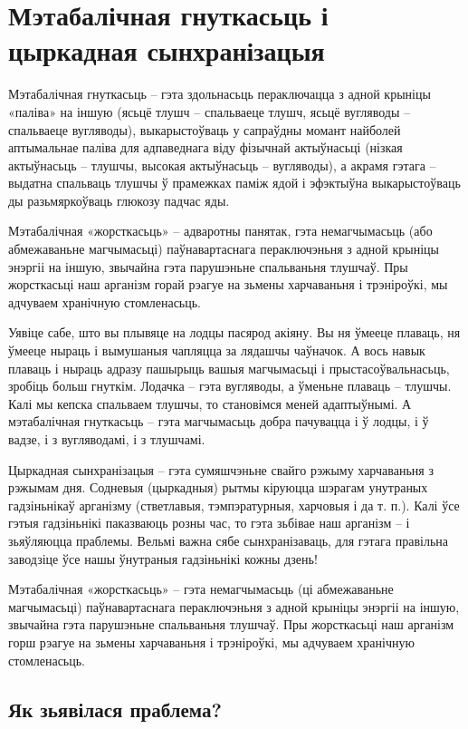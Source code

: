 \chapter{Мэтабалічная гнуткасьць і цыркадная сынхранізацыя}

Мэтабалічная гнуткасьць – гэта здольнасьць пераключацца з адной крыніцы «паліва» на іншую (ясьцё тлушч – спальваеце тлушч, ясьцё вугляводы – спальваеце вугляводы), выкарыстоўваць у сапраўдны момант найболей аптымальнае паліва для адпаведнага віду фізычнай актыўнасьці (нізкая актыўнасьць – тлушчы, высокая актыўнасьць – вугляводы), а акрамя гэтага – выдатна спальваць тлушчы ў прамежках паміж ядой і эфэктыўна выкарыстоўваць ды разьмяркоўваць глюкозу падчас яды.

Мэтабалічная «жорсткасьць» – адваротны панятак, гэта немагчымасьць (або абмежаваньне магчымасьці) паўнавартаснага пераключэньня з адной крыніцы энэргіі на іншую, звычайна гэта парушэньне спальваньня тлушчаў. Пры жорсткасьці наш арганізм горай рэагуе на зьмены харчаваньня і трэніроўкі, мы адчуваем хранічную стомленасьць.

Уявіце сабе, што вы плывяце на лодцы пасярод акіяну. Вы ня ўмееце плаваць, ня ўмееце ныраць і вымушаныя чапляцца за лядашчы чаўначок. А вось навык плаваць і ныраць адразу пашырыць вашыя магчымасьці і прыстасоўвальнасьць, зробіць больш гнуткім. Лодачка – гэта вугляводы, а ўменьне плаваць – тлушчы. Калі мы кепска спальваем тлушчы, то становімся меней адаптыўнымі. А мэтабалічная гнуткасьць – гэта магчымасьць добра пачувацца і ў лодцы, і ў вадзе, і з вугляводамі, і з тлушчамі.

Цыркадная сынхранізацыя – гэта сумяшчэньне свайго рэжыму харчаваньня з рэжымам дня. Содневыя (цыркадныя) рытмы кіруюцца шэрагам унутраных гадзіньнікаў арганізму (стветлавыя, тэмпэратурныя, харчовыя і да т. п.). Калі ўсе гэтыя гадзіньнікі паказваюць розны час, то гэта зьбівае наш арганізм – і зьяўляюцца праблемы. Вельмі важна сябе сынхранізаваць, для гэтага правільна заводзіце ўсе нашы ўнутраныя гадзіньнікі кожны дзень!

Мэтабалічная «жорсткасьць» – гэта немагчымасьць (ці абмежаваньне магчымасьці) паўнавартаснага пераключэньня з адной крыніцы энэргіі на іншую, звычайна гэта парушэньне спальваньня тлушчаў. Пры жорсткасьці наш арганізм горш рэагуе на зьмены харчаваньня і трэніроўкі, мы адчуваем хранічную стомленасьць.

\section{Як зьявілася праблема?}

